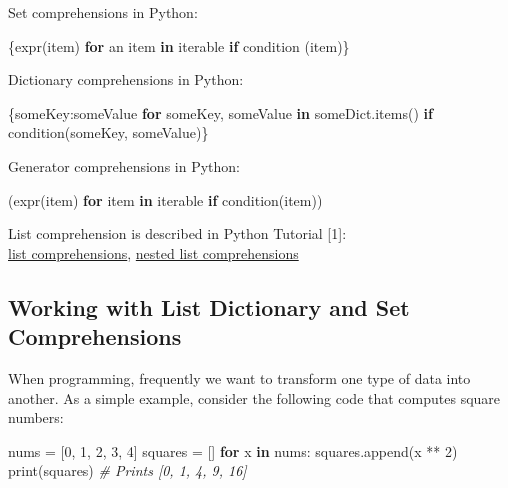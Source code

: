 \documentclass[
]{article}
\newenvironment{Shaded}{}{}
\newcommand{\BuiltInTok}[1]{#1}
\newcommand{\CommentTok}[1]{\textcolor[rgb]{0.38,0.63,0.69}{\textit{#1}}}
\newcommand{\ControlFlowTok}[1]{\textcolor[rgb]{0.00,0.44,0.13}{\textbf{#1}}}
\newcommand{\DecValTok}[1]{\textcolor[rgb]{0.25,0.63,0.44}{#1}}
\newcommand{\KeywordTok}[1]{\textcolor[rgb]{0.00,0.44,0.13}{\textbf{#1}}}
\newcommand{\NormalTok}[1]{#1}
\newcommand{\OperatorTok}[1]{\textcolor[rgb]{0.40,0.40,0.40}{#1}}
\begin{document}
Set comprehensions in Python:

\begin{Shaded}
\begin{Highlighting}[]
\NormalTok{\{expr(item) }\ControlFlowTok{for}\NormalTok{ an item }\KeywordTok{in}\NormalTok{ iterable }\ControlFlowTok{if}\NormalTok{ condition (item)\}}
\end{Highlighting}
\end{Shaded}

Dictionary comprehensions in Python:

\begin{Shaded}
\begin{Highlighting}[]
\NormalTok{\{someKey:someValue }\ControlFlowTok{for}\NormalTok{ someKey, someValue }\KeywordTok{in}\NormalTok{ someDict.items() }\ControlFlowTok{if}\NormalTok{ condition(someKey, someValue)\}}
\end{Highlighting}
\end{Shaded}

Generator comprehensions in Python:

\begin{Shaded}
\begin{Highlighting}[]
\NormalTok{(expr(item) }\ControlFlowTok{for}\NormalTok{ item }\KeywordTok{in}\NormalTok{ iterable }\ControlFlowTok{if}\NormalTok{ condition(item))}
\end{Highlighting}
\end{Shaded}

List comprehension is described in Python Tutorial {[}1{]}: \\
\href{https://docs.python.org/3/tutorial/datastructures.html\#list-comprehensions}{list
comprehensions},
\href{https://docs.python.org/3/tutorial/datastructures.html\#nested-list-comprehensions}{nested
list comprehensions}

\hypertarget{working-with-list-dictionary-and-set-comprehensions}{%
\subsection{Working with List Dictionary and Set
Comprehensions}\label{working-with-list-dictionary-and-set-comprehensions}}

When programming, frequently we want to transform one type of data into
another. As a simple example, consider the following code that computes
square numbers:

\begin{Shaded}
\begin{Highlighting}[]
\NormalTok{nums }\OperatorTok{=}\NormalTok{ [}\DecValTok{0}\NormalTok{, }\DecValTok{1}\NormalTok{, }\DecValTok{2}\NormalTok{, }\DecValTok{3}\NormalTok{, }\DecValTok{4}\NormalTok{]}
\NormalTok{squares }\OperatorTok{=}\NormalTok{ []}
\ControlFlowTok{for}\NormalTok{ x }\KeywordTok{in}\NormalTok{ nums:}
\NormalTok{    squares.append(x }\OperatorTok{**} \DecValTok{2}\NormalTok{)}
\BuiltInTok{print}\NormalTok{(squares)   }\CommentTok{\# Prints [0, 1, 4, 9, 16]}
\end{Highlighting}
\end{Shaded}
\end{document}
